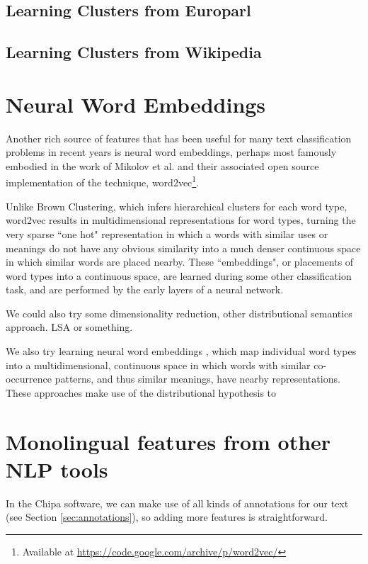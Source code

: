 \subsection{Learning Clusters from Europarl}

\subsection{Learning Clusters from Wikipedia}


\section{Neural Word Embeddings}
Another rich source of features that has been useful for many text
classification problems in recent years is neural word embeddings, perhaps most
famously embodied in the work of Mikolov et al. \cite{mikolovword2vec} and
their associated open source implementation of the technique,
word2vec\footnote{Available at
\url{https://code.google.com/archive/p/word2vec/}}.

Unlike Brown Clustering, which infers hierarchical clusters for each word type,
word2vec results in multidimensional representations for word types, turning
the very sparse ``one hot" representation in which a words with similar uses or
meanings do not have any obvious similarity into a much denser continuous space
in which similar words are placed nearby. These ``embeddings", or placements of
word types into a continuous space, are learned during some other
classification task, and are performed by the early layers of a neural network.

We could also try some dimensionality reduction, other distributional semantics
approach. LSA or something.


We also try learning neural word embeddings \cite{mikolovword2vec}, which map
individual word types into a multidimensional, continuous space in which words
with similar co-occurrence patterns, and thus similar meanings, have nearby
representations.  These approaches make use of the distributional hypothesis to 

\section{Monolingual features from other NLP tools}
In the Chipa software, we can make use of all kinds of annotations for our
text (see Section \ref{sec:annotations}), so adding more features is
straightforward.


